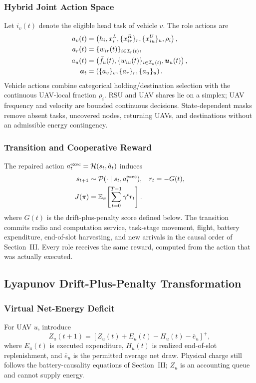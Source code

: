 \subsubsection{Hybrid Joint Action Space}
Let $i_v(t)$ denote the eligible head task of vehicle $v$. The role actions are
\begin{align}
a_v(t)&=\left(h_i,x_i^{L},\{x_{ir}^{R}\}_{r},
\{x_{iu}^{U}\}_{u},\rho_i\right),\nonumber\\
a_r(t)&=\{w_{ir}(t)\}_{i\in\mathcal I_r(t)},\nonumber\\
a_u(t)&=\left(\bar f_u(t),\{w_{iu}(t)\}_{i\in\mathcal I_u(t)},
\boldsymbol{u}_u(t)\right),\nonumber\\
\boldsymbol{a}_t&=\left(\{a_v\}_v,\{a_r\}_r,\{a_u\}_u\right).
\label{eq:joint_action}
\end{align}
Vehicle actions combine categorical holding/destination selection with the
continuous UAV-local fraction $\rho_i$. RSU and UAV shares lie on a simplex;
UAV frequency and velocity are bounded continuous decisions. State-dependent
masks remove absent tasks, uncovered nodes, returning UAVs, and destinations
without an admissible energy contingency.

\subsubsection{Transition and Cooperative Reward}
The repaired action $a_t^{\rm exec}=\mathcal H(s_t,\hat a_t)$ induces
\begin{align}
s_{t+1}&\sim\mathcal P(\cdot\mid s_t,a_t^{\rm exec}),
&r_t&=-G(t),\nonumber\\
J(\pi)&=\mathbb{E}_\pi\!\left[\sum_{t=0}^{T-1}\gamma^t r_t\right].
\label{eq:transition_reward}
\end{align}
where $G(t)$ is the drift-plus-penalty score defined below. The transition
commits radio and computation service, task-stage movement, flight, battery
expenditure, end-of-slot harvesting, and new arrivals in the causal order of
Section~III. Every role receives the same reward, computed from the action
that was actually executed.

\subsection{Lyapunov Drift-Plus-Penalty Transformation}
\subsubsection{Virtual Net-Energy Deficit}
For UAV $u$, introduce
\begin{equation}
Z_u(t+1)=\left[Z_u(t)+E_u(t)-H_u(t)-\bar e_u\right]^+,
\label{eq:virtual_energy_correct}
\end{equation}
where $E_u(t)$ is executed expenditure, $H_u(t)$ is realized end-of-slot
replenishment, and $\bar e_u$ is the permitted average net draw. Physical
charge still follows the battery-causality equations of Section~III; $Z_u$ is
an accounting queue and cannot supply energy.


